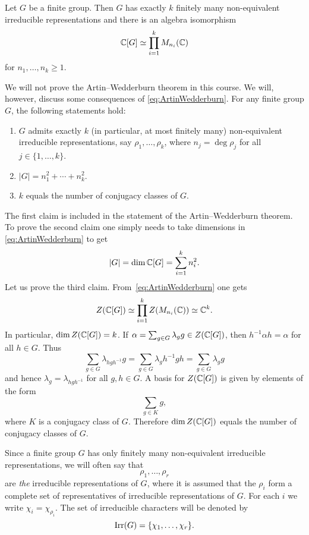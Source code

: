 \begin{theorem}
\label{thm:ArtinWedderburn}
Let $G$ be a finite group. Then $G$ has exactly $k$ finitely
many non-equivalent irreducible representations
and there is an algebra isomorphism 
\begin{equation}
    \label{eq:ArtinWedderburn}
    \mathbb{C}[G]\simeq \prod_{i=1}^k M_{n_i}(\mathbb{C})
\end{equation}
for $n_1,\dots,n_k\geq1$. 
\end{theorem}

We will not prove the Artin--Wedderburn theorem
in this course. We will, however, 
discuss some consequences of \eqref{eq:ArtinWedderburn}. For any finite group $G$, 
the following statements hold: 
\begin{enumerate}
    \item $G$ admits exactly $k$ (in particular, at most finitely many) 
    non-equivalent
    irreducible representations, say $\rho_1,\dots,\rho_k$, where 
    $n_j=\deg\rho_j$ for all $j\in\{1,\dots,k\}$. 
    \item\label{it:|G|} $|G|=n_1^2+\cdots+n_k^2$.
    \item\label{it:conjugacy_classes} $k$ equals the number of conjugacy classes of $G$. 
\end{enumerate}

The first claim is included in the statement of the Artin--Wedderburn theorem. 
To prove the second claim one simply needs to 
take dimensions in \eqref{eq:ArtinWedderburn} to get 
\[
|G|=\dim\mathbb{C}[G]=\sum_{i=1}^k n_i^2.
\]
Let us prove the third claim. From~\eqref{eq:ArtinWedderburn} one gets 
    \[
                Z(\mathbb{C}[G])\simeq\prod_{i=1}^kZ(M_{n_i}(\mathbb{C}))\simeq\mathbb{C}^k.
        \]
        In particular, $\dim Z(\mathbb{C}[G])=k$. If $\alpha=\sum_{g\in
        G}\lambda_gg\in Z(\mathbb{C}[G])$, then $h^{-1}\alpha h=\alpha$ for all $h\in
        G$. Thus
        \[
                \sum_{g\in G}\lambda_{hgh^{-1}}g=
                \sum_{g\in G}\lambda_g h^{-1}gh=\sum_{g\in G}\lambda_gg
        \]
        and hence $\lambda_{g}=\lambda_{hgh^{-1}}$ for all $g,h\in G$. A basis for
        $Z(\mathbb{C}[G])$ is given by elements of the form
        \[
                \sum_{g\in K}g,
        \]
        where $K$ is a conjugacy class of $G$. Therefore $\dim Z(\mathbb{C}[G])$ equals
        the number of conjugacy classes of $G$.

\begin{convention}
    Since a finite group $G$ has only finitely many non-equivalent 
irreducible representations, we will often say
that 
\[
\rho_1,\dots,\rho_r
\]
are \emph{the} irreducible representations of $G$, where it is assumed that
the $\rho_i$ form a complete set of 
representatives of irreducible representations of $G$. For each $i$ we write
$\chi_i=\chi_{\rho_i}$. The set of irreducible characters will be denoted
by 
\[
\operatorname{Irr}(G)=\{\chi_1,\dots,\chi_r\}.
\]


\end{convention}

